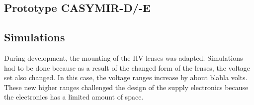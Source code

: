 	

	
	
	
	\subsection{Prototype CASYMIR-D/-E}
	
	\subsection{Simulations}
	
	During development, the mounting of the HV lenses was adapted. Simulations had to be done because as a result of the changed form of the lenses, the voltage set also changed. In this case, the voltage ranges increase by about blabla volts. These new higher ranges challenged the design of the supply electronics because the electronics has a limited amount of space. %
	
	
	

